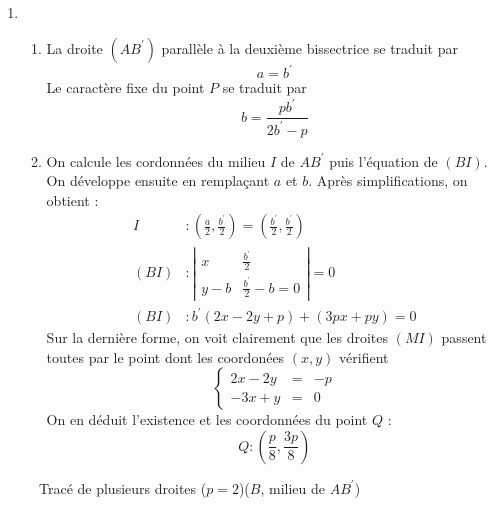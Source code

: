 \begin{enumerate}
 \item \begin{enumerate}
 \item La droite $(AB^\prime)$ parallèle à la deuxième bissectrice se traduit par 
\begin{displaymath}
 a = b^\prime
\end{displaymath}
Le caractère fixe du point $P$ se traduit par 
\begin{displaymath}
 b = \frac{pb^\prime}{2b^\prime -p}
\end{displaymath}
\item On calcule les cordonnées du milieu $I$ de $AB^\prime$ puis l'équation de $(BI)$. On développe ensuite en remplaçant $a$ et $b$. Après simplifications, on obtient :
\begin{align*}
 I &: \left( \frac{a}{2},\frac{b^\prime}{2}\right) = \left( \frac{b^\prime}{2},\frac{b^\prime}{2}\right)\\
 (BI) &: \left \vert \begin{array}{cc}
 x & \frac{b^\prime}{2} \\
y -b & \frac{b^\prime}{2}-b=0
\end{array}
\right \vert  =0  \\
(BI) &: b^\prime (2x-2y+p) +(3px+py)=0
\end{align*}
 Sur la dernière forme, on voit clairement que les droites $(MI)$ passent toutes par le point dont les coordonées $(x,y)$ vérifient
\begin{displaymath}
 \left\lbrace 
\begin{array}{lcr}
2x-2y &=& -p \\
-3x + y &=& 0
\end{array}
\right. 
\end{displaymath}
On en déduit l'existence et les coordonnées du point $Q$ :
\begin{displaymath}
 Q : \left( \frac{p}{8}, \frac{3p}{8}\right) 
\end{displaymath}

\end{enumerate}

\end{enumerate}

\begin{figure}
	\begin{center}
	
	\end{center}
\caption{Tracé de plusieurs droites ($p=2$)($B$, milieu de $AB^\prime$)}
\end{figure}